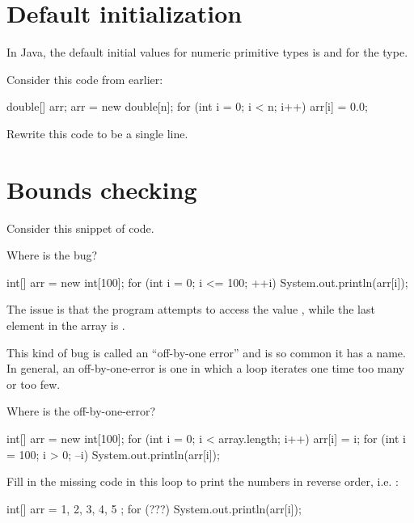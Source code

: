 \section{Default initialization}

In Java, the default initial values for numeric primitive types is  and  for the  type.

\begin{example}
Consider this code from earlier:

\begin{code}
double[] arr;
arr = new double[n];
for (int i = 0; i < n; i++) {
    arr[i] = 0.0;
}
\end{code}

Rewrite this code to be a single line.
\end{example}

\section{Bounds checking}

Consider this snippet of code.

\begin{example}Where is the bug?
\begin{code}
int[] arr = new int[100]; 
for (int i = 0; i <= 100; ++i) {
    System.out.println(arr[i]);
}
\end{code}
\end{example}

The issue is that the program attempts to access the value , while the last element in the array is .

This kind of bug is called an ``off-by-one error'' and is so common it has a name. In general, an off-by-one-error is one in which a loop iterates one time too many or too few.

\begin{example}
Where is the off-by-one-error?

\begin{code}
int[] arr = new int[100];
for (int i = 0; i < array.length; i++) {
    arr[i] = i;
}
for (int i = 100; i > 0; --i) {
    System.out.println(arr[i]);
}
\end{code}
\end{example}

\begin{example}
Fill in the missing code in this  loop to print the numbers in reverse order, i.e. :

\begin{code}
int[] arr = { 1, 2, 3, 4, 5 };
for (???) {
    System.out.println(arr[i]);
}
\end{code}
\end{example}

